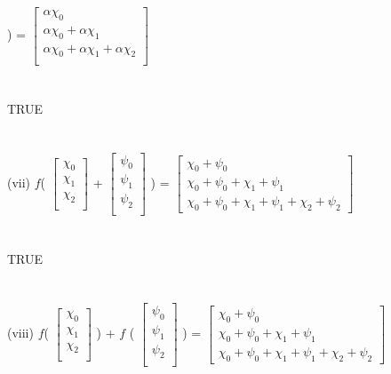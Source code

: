 \documentclass[11pt]{article}
\begin{document}
)
=
$
\begin{bmatrix}
{\alpha\chi_{0}}\\
{\alpha\chi_{0} + \alpha\chi_{1}}\\
{\alpha\chi_{0} + \alpha\chi_{1} + \alpha\chi_{2}}\\
\end{bmatrix}$
\\
\\
\\
TRUE
\\
\\
\\
(vii)
$f$(
$
\begin{bmatrix}
{\chi_{0}}\\
{\chi_{1}}\\
{\chi_{2}}\\
\end{bmatrix}$
+
$
\begin{bmatrix}
{\psi_{0}}\\
{\psi_{1}}\\
{\psi_{2}}\\
\end{bmatrix}$
)
=
$
\begin{bmatrix}
{\chi_{0} + \psi_{0}}\\
{\chi_{0} + \psi_{0} + \chi_{1} + \psi_{1}}\\
{\chi_{0} + \psi_{0} + \chi_{1} + \psi_{1} + \chi_{2} + \psi_{2}}
\end{bmatrix}$
\\
\\
\\
TRUE
\\
\\
\\
(viii)
$f$(
$
\begin{bmatrix}
{\chi_{0}}\\
{\chi_{1}}\\
{\chi_{2}}\\
\end{bmatrix}$
)
+
$f$
(
$
\begin{bmatrix}
{\psi_{0}}\\
{\psi_{1}}\\
{\psi_{2}}\\
\end{bmatrix}$
)
=
$
\begin{bmatrix}
{\chi_{0} + \psi_{0}}\\
{\chi_{0} + \psi_{0} + \chi_{1} + \psi_{1}}\\
{\chi_{0} + \psi_{0} + \chi_{1} + \psi_{1} + \chi_{2} + \psi_{2}}
\end{bmatrix}$
\end{document}
